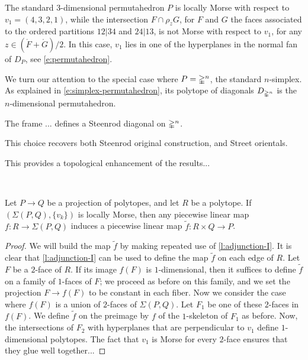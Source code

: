 \begin{example}
	The standard $3$-dimensional permutahedron $P$ is locally Morse with respect to $v_1=(4,3,2,1)$, while the intersection $F \cap \rho_z G$, for $F$ and $G$ the faces associated to the ordered partitions $12|34$ and $24|13$, is not Morse with respect to $v_1$, for any $z \in (\mathring F + \mathring G)/2$.
	In this case, $v_1$ lies in one of the hyperplanes in the normal fan of $D_P$, see \cref{e:permutahedron}.
\end{example}


We turn our attention to the special case where $P = \mathbb{\Delta}^n$, the standard $n$-simplex.
As explained in \cref{e:simplex-permutahedron}, its polytope of diagonals $D_{\mathbb{\Delta}^n}$ is the $n$-dimensional permutahedron.

\begin{lemma}
	The frame ... defines a Steenrod diagonal on $\mathbb{\Delta}^n$.
\end{lemma}

\begin{theorem}
	This choice recovers both Steenrod original construction, and Street orientals.
\end{theorem}

This provides a topological enhancement of the results...



\ \ \


\begin{theorem}
	Let $P \to Q$ be a projection of polytopes, and let $R$ be a polytope.
	If $(\Sigma(P,Q), \{v_k\})$ is locally Morse, then any piecewise linear map $f: R \to \Sigma(P,Q)$ induces a piecewise linear map $\tilde f : R \times Q \to P$.
\end{theorem}

\begin{proof}
	We will build the map $\tilde f$ by making repeated use of \cref{l:adjunction-I}.
	It is clear that \cref{l:adjunction-I} can be used to define the map $\tilde f$ on each edge of $R$.
	Let $F$ be a $2$-face of $R$.
	If its image $f(F)$ is $1$-dimensional, then it suffices to define $\tilde f$ on a family of $1$-faces of $F$; we proceed as before on this family, and we set the projection $F \to f(F)$ to be constant in each fiber.
	Now we consider the case where $f(F)$ is a union of $2$-faces of $\Sigma(P,Q)$.
	Let $F_1$ be one of these $2$-faces in $f(F)$.
	We define $\tilde f$ on the preimage by $f$ of the $1$-skeleton of $F_1$ as before.
	Now, the intersections of $F_2$ with hyperplanes that are perpendicular to $v_1$ define $1$-dimensional polytopes.
	The fact that $v_1$ is Morse for every $2$-face ensures that they glue well together...
\end{proof}

